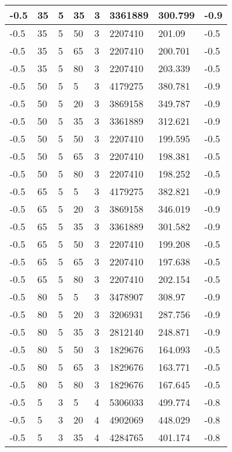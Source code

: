 \begin{longtable}{|p{1.4cm}|p{1.4cm}|p{1.4cm}|p{1.4cm}|p{1.4cm}|p{1.4cm}|p{1.4cm}|p{1.5cm}|}
        -0.5 & 35 & 5 & 35 & 3 & 3361889 & 300.799 & -0.9 \\ \hline
        -0.5 & 35 & 5 & 50 & 3 & 2207410 & 201.09 & -0.5 \\ \hline
        -0.5 & 35 & 5 & 65 & 3 & 2207410 & 200.701 & -0.5 \\ \hline
        -0.5 & 35 & 5 & 80 & 3 & 2207410 & 203.339 & -0.5 \\ \hline
        -0.5 & 50 & 5 & 5 & 3 & 4179275 & 380.781 & -0.9 \\ \hline
        -0.5 & 50 & 5 & 20 & 3 & 3869158 & 349.787 & -0.9 \\ \hline
        -0.5 & 50 & 5 & 35 & 3 & 3361889 & 312.621 & -0.9 \\ \hline
        -0.5 & 50 & 5 & 50 & 3 & 2207410 & 199.595 & -0.5 \\ \hline
        -0.5 & 50 & 5 & 65 & 3 & 2207410 & 198.381 & -0.5 \\ \hline
        -0.5 & 50 & 5 & 80 & 3 & 2207410 & 198.252 & -0.5 \\ \hline
        -0.5 & 65 & 5 & 5 & 3 & 4179275 & 382.821 & -0.9 \\ \hline
        -0.5 & 65 & 5 & 20 & 3 & 3869158 & 346.019 & -0.9 \\ \hline
        -0.5 & 65 & 5 & 35 & 3 & 3361889 & 301.582 & -0.9 \\ \hline
        -0.5 & 65 & 5 & 50 & 3 & 2207410 & 199.208 & -0.5 \\ \hline
        -0.5 & 65 & 5 & 65 & 3 & 2207410 & 197.638 & -0.5 \\ \hline
        -0.5 & 65 & 5 & 80 & 3 & 2207410 & 202.154 & -0.5 \\ \hline
        -0.5 & 80 & 5 & 5 & 3 & 3478907 & 308.97 & -0.9 \\ \hline
        -0.5 & 80 & 5 & 20 & 3 & 3206931 & 287.756 & -0.9 \\ \hline
        -0.5 & 80 & 5 & 35 & 3 & 2812140 & 248.871 & -0.9 \\ \hline
        -0.5 & 80 & 5 & 50 & 3 & 1829676 & 164.093 & -0.5 \\ \hline
        -0.5 & 80 & 5 & 65 & 3 & 1829676 & 163.771 & -0.5 \\ \hline
        -0.5 & 80 & 5 & 80 & 3 & 1829676 & 167.645 & -0.5 \\ \hline
        -0.5 & 5 & 3 & 5 & 4 & 5306033 & 499.774 & -0.8 \\ \hline
        -0.5 & 5 & 3 & 20 & 4 & 4902069 & 448.029 & -0.8 \\ \hline
        -0.5 & 5 & 3 & 35 & 4 & 4284765 & 401.174 & -0.8 \\ \hline

\end{longtable}
